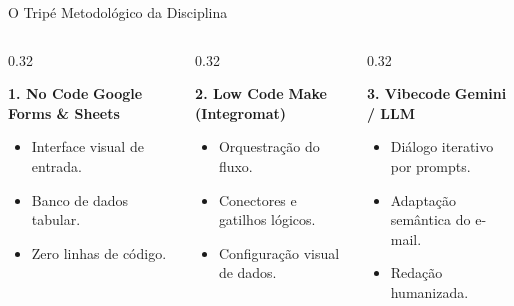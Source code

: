 \documentclass[aspectratio=169, 10pt]{beamer}
\begin{document}
\begin{frame}{O Tripé Metodológico da Disciplina}
    \begin{columns}[T]
        \begin{column}{0.32\textwidth}
            \begin{block}{\textbf{1. No Code}}
                \textbf{Google Forms \& Sheets}
                \begin{itemize}
                    \item Interface visual de entrada.
                    \item Banco de dados tabular.
                    \item Zero linhas de código.
                \end{itemize}
            \end{block}
        \end{column}

        \begin{column}{0.32\textwidth}
            \begin{block}{\textbf{2. Low Code}}
                \textbf{Make (Integromat)}
                \begin{itemize}
                    \item Orquestração do fluxo.
                    \item Conectores e gatilhos lógicos.
                    \item Configuração visual de dados.
                \end{itemize}
            \end{block}
        \end{column}

        \begin{column}{0.32\textwidth}
            \begin{block}{\textbf{3. Vibecode}}
                \textbf{Gemini / LLM}
                \begin{itemize}
                    \item Diálogo iterativo por prompts.
                    \item Adaptação semântica do e-mail.
                    \item Redação humanizada.
                \end{itemize}
            \end{block}
        \end{column}
    \end{columns}
\end{frame}
\end{document}

